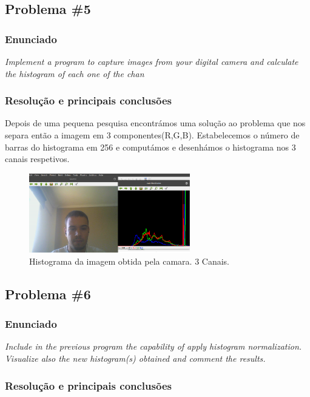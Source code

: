 \documentclass[portuguese, times, mirror]{revdetua}
\begin{document}
\newpage

\subsection{Problema \#5}

\subsubsection{Enunciado}
\textit{Implement a program to capture images from your digital camera and calculate the histogram of
each one of the chan}

\subsubsection{Resolução e principais conclusões}

Depois de uma pequena pesquisa encontrámos uma solução ao problema que nos separa então a imagem em 3 componentes(R,G,B). Estabelecemos o número de barras do histograma em 256 e computámos e desenhámos o histograma nos 3 canais respetivos.


\begin{figure}[ht!]
\centering
\includegraphics[width=70mm]{img/5_1.png}
\caption{Histograma da imagem obtida pela camara. 3 Canais. }
\end{figure}

\subsection{Problema \#6}

\subsubsection{Enunciado}
\textit{Include in the previous program the capability of apply histogram normalization. Visualize also
the new histogram(s) obtained and comment the results.}

\subsubsection{Resolução e principais conclusões}
\end{document}
